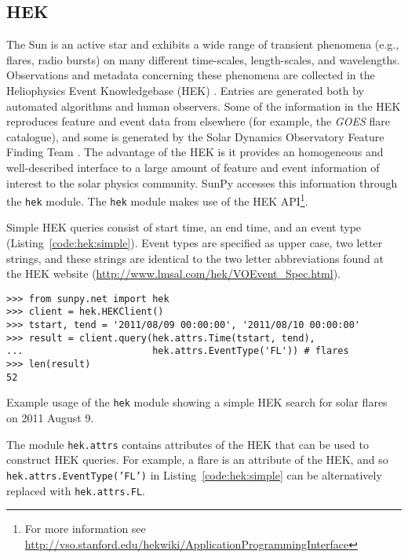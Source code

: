 \subsection{HEK}\label{ssec:hek}

The Sun is an active star and exhibits a wide range of transient phenomena 
(e.g., flares, radio bursts) on many different time-scales, length-scales, and 
wavelengths. Observations and metadata concerning these phenomena are collected 
in the Heliophysics Event Knowledgebase (HEK) \citep{hek2012}.  Entries are generated both by 
automated algorithms and human observers.  Some of the information in the HEK 
reproduces feature and event data from elsewhere (for example, the \textit{GOES} flare catalogue),
and some is generated by the Solar Dynamics Observatory Feature Finding Team 
\citep{martens2012}.  The advantage of the HEK is it 
provides an homogeneous and well-described interface to a large amount of 
feature and event information of interest to the solar physics community. SunPy 
accesses this information through the \texttt{hek} module.  The \texttt{hek} module makes use of the 
HEK API\footnote{For more information see \url{http://vso.stanford.edu/hekwiki/ApplicationProgrammingInterface}}.

Simple HEK queries consist of start time, an end time, and an event type 
(Listing~\ref{code:hek:simple}). Event types are specified as upper case, 
two letter strings, and these strings are 
identical to the two letter abbreviations found at the HEK website
(\url{http://www.lmsal.com/hek/VOEvent_Spec.html}).

\begin{listing}[H]
\begin{verbatim}
>>> from sunpy.net import hek
>>> client = hek.HEKClient()
>>> tstart, tend = '2011/08/09 00:00:00', '2011/08/10 00:00:00'
>>> result = client.query(hek.attrs.Time(tstart, tend), 
...                       hek.attrs.EventType('FL')) # flares
>>> len(result)
52
\end{verbatim}
\caption{Example usage of the \texttt{hek} module showing a simple HEK search for solar flares
on 2011 August 9.}
\label{code:hek:simple}
\end{listing}

The module \texttt{hek.attrs} contains attributes of the HEK that can be used to
construct HEK queries.  For example, a flare is an attribute of the HEK,
 and so 
\texttt{hek.attrs.EventType('FL')} in Listing~\ref{code:hek:simple}
can be alternatively replaced with \texttt{hek.attrs.FL}. 

